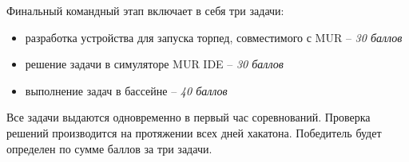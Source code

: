 Финальный командный этап включает в себя три задачи: 

\begin{itemize}
    \item разработка устройства для запуска торпед, совместимого с MUR – \textit{30 баллов}
    \item решение задачи в симуляторе MUR IDE – \textit{30 баллов}
    \item выполнение задач в бассейне – \textit{40 баллов}
\end{itemize}

Все задачи выдаются одновременно в первый час соревнований. Проверка решений производится на протяжении всех дней хакатона. Победитель будет определен по сумме баллов за три задачи.